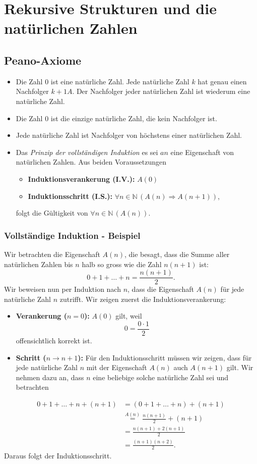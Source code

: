\section{Rekursive Strukturen und die natürlichen Zahlen}
\subsection{Peano-Axiome}
\begin{itemize}
	\item Die Zahl 0 ist eine natürliche Zahl. Jede natürliche Zahl $k$ hat genau einen Nachfolger $k+1A$. Der Nachfolger jeder natürlichen Zahl ist wiederum eine natürliche Zahl.
	\item Die Zahl 0 ist die einzige natürliche Zahl, die kein Nachfolger ist.
	\item Jede natürliche Zahl ist Nachfolger von höchstens einer natürlichen Zahl.
	\item Das \textit{Prinzip der vollständigen Induktion} es sei $a{n}$ eine Eigenschaft von natürlichen Zahlen. Aus beiden Voraussetzungen
	      \begin{itemize}
		      \item \textbf{Induktionsverankerung (I.V.):} $A(0)$
		      \item \textbf{Induktionsschritt (I.S.):} $\forall n\in \mathbb{N}\,(A(n)\Rightarrow A(n+1))$,
	      \end{itemize}
	      folgt die Gültigkeit von $\forall n\in\mathbb{N}\,(A(n))$.
\end{itemize}

\subsubsection{Vollständige Induktion - Beispiel}
Wir betrachten die Eigenschaft $A(n)$, die besagt, dass die Summe aller natürlichen Zahlen bis $n$ halb so gross wie die Zahl $n(n+1)$ ist:
\[
	0+1+\dots+n =\frac{n(n+1)}{2}.
\]
Wir beweisen nun per Induktion nach $n$, dass die Eigenschaft $A(n)$ für jede natürliche Zahl $n$ zutrifft.
Wir zeigen zuerst die Induktionsverankerung:
\begin{itemize}
	\item \textbf{Verankerung ($n=0$):} $A(0)$ gilt, weil
	      \[
		      0=\frac{0\cdot 1}{2}
	      \]
	      offensichtlich korrekt ist.
	\item \textbf{Schritt ($n\to n+1$):} Für den Induktionsschritt müssen wir zeigen, dass für jede natürliche Zahl $n$ mit der Eigenschaft $A(n)$ auch $A(n+1)$ gilt. Wir nehmen dazu an, dass $n$ eine beliebige solche natürliche Zahl sei und betrachten
\end{itemize}
\begin{align*}
	0+1+\dots +n+(n+1) & =(0+1+\dots +n)+(n+1)                    \\
	                   & \stackrel{A(n)}{=}\frac{n(n+1)}{2}+(n+1) \\
	                   & =\frac{n(n+1)+2(n+1)}{2}                 \\
	                   & =\frac{(n+1)(n+2)}{2}.
\end{align*}
Daraus folgt der Induktionsschritt.

